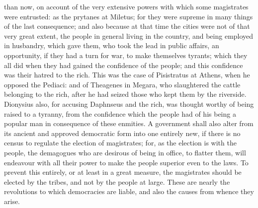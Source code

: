 than now, on account of the very extensive powers with which some
magistrates were entrusted: as the prytanes at Miletus; for they were
supreme in many things of the last consequence; and also because at that
time the cities were not of that very great extent, the people in general
living in the country, and being employed in husbandry, which gave them,
who took the lead in public affairs, an opportunity, if they had a turn
for war, to make themselves tyrants; which they all did when they had
gained the confidence of the people; and this confidence was their hatred
to the rich. This was the case of Pisistratus at Athens, when he opposed
the Pediaci: and of Theagenes in Megara, who slaughtered the cattle
belonging to the rich, after he had seized those who kept them by the
riverside. Dionysius also, for accusing Daphnseus and the rich, was
thought worthy of being raised to a tyranny, from the confidence which the
people had of his being a popular man in consequence of these enmities. A
government shall also alter from its ancient and approved democratic form
into one entirely new, if there is no census to regulate the election of
magistrates; for, as the election is with the people, the demagogues who
are desirous of being in office, to flatter them, will endeavour with all
their power to make the people superior even to the laws. To prevent this
entirely, or at least in a great measure, the magistrates should be
elected by the tribes, and not by the people at large. These are nearly
the revolutions to which democracies are liable, and also the causes from
whence they arise.



